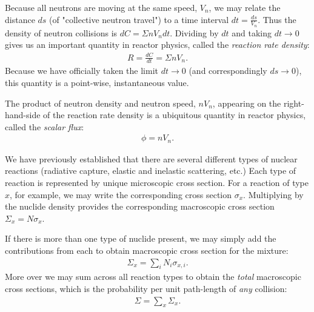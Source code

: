 \documentclass[11pt]{article}
\begin{document}
Because all neutrons are moving at the same speed, \(V_n\), we may relate the distance \(ds\) (of "collective neutron travel") to a time interval \(dt = \frac{ds}{V_n}\).  Thus the density of neutron collisions is \(dC = \Sigma n V_n dt\).  Dividing by \(dt\) and taking \(dt \rightarrow 0\) gives us an important quantity in reactor physics, called the \emph{reaction rate density}:
\begin{align}
  R = \frac{dC}{dt} = \Sigma n V_n.
\end{align}
Because we have officially taken the limit \(dt \rightarrow 0\) (and correspondingly \(ds \rightarrow 0\)), this quantity is a point-wise, instantaneous value.

The product of neutron density and neutron speed, \(n V_n\), appearing on the right-hand-side of the reaction rate density is a ubiquitous quantity in reactor physics, called the \emph{scalar flux}:
\begin{align}
  \phi = n V_n.
\end{align}

We have previously established that there are several different types of nuclear reactions (radiative capture, elastic and inelastic scattering, etc.)  Each type of reaction is represented by unique microscopic cross section.  For a reaction of type \(x\), for example, we may write the corresponding cross section \(\sigma_x\).  Multiplying by the nuclide density provides the corresponding macroscopic cross section \(\Sigma_x = N \sigma_x\).

If there is more than one type of nuclide present, we may simply add the contributions from each to obtain macroscopic cross section for the mixture:
\begin{align}
  \Sigma_x = \sum_i N_i \sigma_{x,i}.
\end{align}
More over we may sum across all reaction types to obtain the \emph{total} macroscopic cross sections, which is the probability per unit path-length of \emph{any} collision:
\begin{align}
  \Sigma = \sum_x \Sigma_x.
\end{align}
\end{document}
